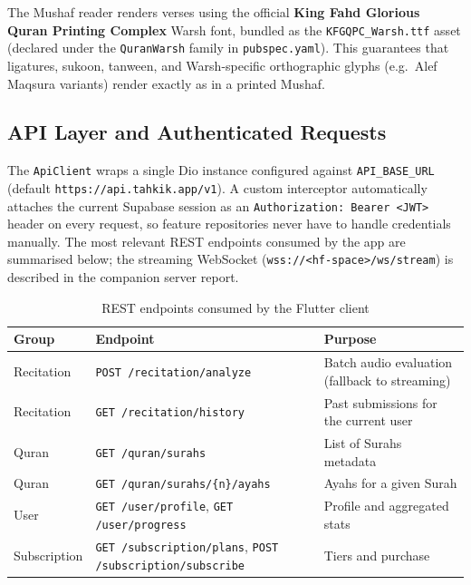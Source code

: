 \begin{infobox}[title=Custom Warsh Font]
The Mushaf reader renders verses using the official \textbf{King Fahd Glorious Quran Printing Complex} Warsh font, bundled as the \texttt{KFGQPC\_Warsh.ttf} asset (declared under the \texttt{QuranWarsh} family in \texttt{pubspec.yaml}). This guarantees that ligatures, sukoon, tanween, and Warsh-specific orthographic glyphs (e.g.\ Alef Maqsura variants) render exactly as in a printed Mushaf.
\end{infobox}

\subsection{API Layer and Authenticated Requests}

The \texttt{ApiClient} wraps a single Dio instance configured against \texttt{API\_BASE\_URL} (default \texttt{https://api.tahkik.app/v1}). A custom interceptor automatically attaches the current Supabase session as an \texttt{Authorization: Bearer <JWT>} header on every request, so feature repositories never have to handle credentials manually. The most relevant REST endpoints consumed by the app are summarised below; the streaming WebSocket (\texttt{wss://<hf-space>/ws/stream}) is described in the companion server report.

\begin{table}[H]
  \centering
  \caption{REST endpoints consumed by the Flutter client}
  \label{tab:impl_app_endpoints}
  \renewcommand{\arraystretch}{1.3}
  \begin{tabular}{llp{6.5cm}}
    \toprule
    \textbf{Group} & \textbf{Endpoint} & \textbf{Purpose} \\
    \midrule
    Recitation & \texttt{POST /recitation/analyze} & Batch audio evaluation (fallback to streaming) \\
    Recitation & \texttt{GET /recitation/history}  & Past submissions for the current user \\
    Quran      & \texttt{GET /quran/surahs}        & List of Surahs metadata \\
    Quran      & \texttt{GET /quran/surahs/\{n\}/ayahs} & Ayahs for a given Surah \\
    User       & \texttt{GET /user/profile}, \texttt{GET /user/progress} & Profile and aggregated stats \\
    Subscription & \texttt{GET /subscription/plans}, \texttt{POST /subscription/subscribe} & Tiers and purchase \\
    \bottomrule
  \end{tabular}
\end{table}

